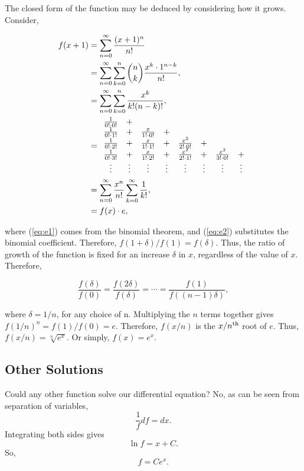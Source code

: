 \documentclass[11pt]{amsart}
\begin{document}
The closed form of the function may be deduced by considering how it grows. Consider,

\begin{align}
f(x + 1) &= \sum_{n=0}^{\infty} \frac{(x + 1)^n}{n!} \notag \\
&= \sum_{n=0}^{\infty} \sum_{k=0}^{n}{{n}\choose{k}}\frac{x^k \cdot 1^{n-k}}{n!} \label{eq:e1}, \\
&= \sum_{n=0}^{\infty} \sum_{k=0}^{n}\frac{x^k}{k!(n-k)!} \label{eq:e2}, \\
&= \begin{array}{cccccccc}
\frac{1}{0! \cdot 0!} & + & & & & \\
\frac{1}{0! \cdot 1!} & + & \frac{x}{1! \cdot 0!} & + & & & & \\
\frac{1}{0! \cdot 2!} & + & \frac{x}{1! \cdot 1!} & + & \frac{x^2}{2! \cdot 0!} & + & &\\
\frac{1}{0! \cdot 3!} & + & \frac{x}{1! \cdot 2!} & + & \frac{x^2}{2! \cdot 1!} & + & \frac{x^3}{3! \cdot 0!} & +\\
\vdots & \vdots  & \vdots  &\vdots  & \vdots  & \vdots  & \vdots  & \vdots 
\end{array} \notag \\
&= \sum_{n=0}^{\infty} \frac{x^n}{n!} \sum_{k=0}^{\infty} \frac{1}{k!} \notag, \\
&= f(x) \cdot e \notag,
\end{align}

where (\ref{eq:e1}) comes from the binomial theorem, and (\ref{eq:e2}) substitutes the binomial coefficient. Therefore, $f(1 + \delta) / f(1) = f(\delta)$. Thus, the ratio of growth of the function is fixed for an increase $\delta$ in $x$, regardless of the value of $x$. Therefore,

$$\frac{f(\delta)}{f(0)} = \frac{f(2\delta)}{f(\delta)} = \cdots = \frac{f(1)}{f((n-1)\delta)},$$

where $\delta = 1 / n$, for any choice of n. Multiplying the $n$ terms together gives $f(1/n)^n = f(1) / f(0) = e$. Therefore, $f(x/n)$ is the $x/n\textsuperscript{th}$ root of $e$. Thus, $f(x/n) = \sqrt[n]{e^x}$. Or simply, $f(x) = e^x$.

\subsection{Other Solutions}

Could any other function solve our differential equation? No, as can be seen from separation of variables, $$\frac{1}{f}df = {dx}.$$ Integrating both sides gives $$\ln{f} = x + C.$$ So, $$f = Ce^x.$$
\end{document}
